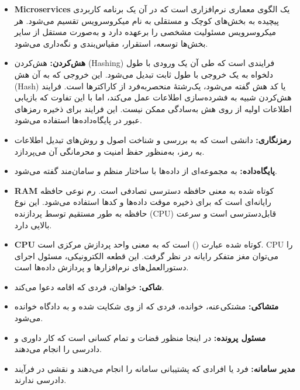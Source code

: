 \documentclass[12pt,a4paper,oneside]{article}
\begin{document}
\begin{itemize}
						  \item
						  \textbf{Microservices\rl{:}\label{ref:microservice}}
						یک الگوی معماری نرم‌افزاری است که در آن یک برنامه کاربردی پیچیده به بخش‌های کوچک و مستقلی به نام میکروسرویس تقسیم می‌شود. هر میکروسرویس مسئولیت مشخصی را برعهده دارد و به‌صورت مستقل از سایر بخش‌ها توسعه، استقرار، مقیاس‌بندی و نگه‌داری می‌شود.
						  
						  \item 
						  \textbf{هش‌کردن:\label{ref:hash}}
						   هش‌کردن (Hashing) فرایندی است که طی آن یک ورودی با طول دلخواه به یک خروجی با طول ثابت تبدیل می‌شود. این خروجی که به آن هش (Hash) یا کد هش  گفته می‌شود، یک‌رشتهٔ منحصربه‌فرد از کاراکترها است. فرایند هش‌کردن شبیه به فشرده‌سازی اطلاعات عمل می‌کند، اما با این تفاوت که بازیابی اطلاعات اولیه از روی هش به‌سادگی ممکن نیست. این فرایند برای ذخیره رمزهای عبور در پایگاه‌داده‌ها استفاده می‌شود.
				
						   \item
						   \textbf{رمزنگاری:\label{ref:encryption}}
							دانشی است که به بررسی و شناخت اصول و روش‌های تبدیل اطلاعات به رمز، به‌منظور حفظ امنیت و محرمانگی آن می‌پردازد.
							 				 
							\item 
							\textbf{پایگاه‌داده:\label{ref:database}}
							به مجموعه‌ای از داده‌ها با ساختار منظم و سامان‌مند گفته می‌شود.

							\item 
							\textbf{RAM\rl{:}\label{ref:ram}}
							کوتاه شده
							 به معنی حافظه دسترسی تصادفی است. رم نوعی حافظه رایانه‌ای است که برای ذخیره موقت داده‌ها و کدها استفاده می‌شود. این نوع حافظه به طور مستقیم توسط پردازنده (CPU) قابل‌دسترسی است و سرعت بالایی دارد.
							 
							 \item
							\textbf{CPU\rl{:}\label{ref:cpu}}
							کوتاه شده عبارت
							 ()
							  است که به معنی واحد پردازش مرکزی است. CPU را می‌توان مغز متفکر رایانه در نظر گرفت. این قطعه الکترونیکی، مسئول اجرای دستورالعمل‌های نرم‌افزارها و پردازش داده‌ها است.	
							  
							  \item 
								\textbf{شاکی:\label{ref:complainant}} 
								خواهان، فردی که اقامه دعوا می‌کند.
								
								\item 
								\textbf{متشاکی:\label{ref:defendant}} 
								مشتکی‌عنه، خوانده، فردی که از وی شکایت شده و به دادگاه خوانده می‌شود.
								
								\item 
								\textbf{مسئول پرونده:\label{ref:caseofficer}} 
								در اینجا منظور قضات و تمام کسانی است که کار داوری و دادرسی را انجام می‌دهند.
								
								\item 
								\textbf{مدیر سامانه:\label{ref:admin}} 
								فرد یا افرادی که پشتیبانی سامانه را انجام می‌دهند و نقشی در فرآیند دادرسی ندارند.
														

			\end{itemize}
		
\end{document}
